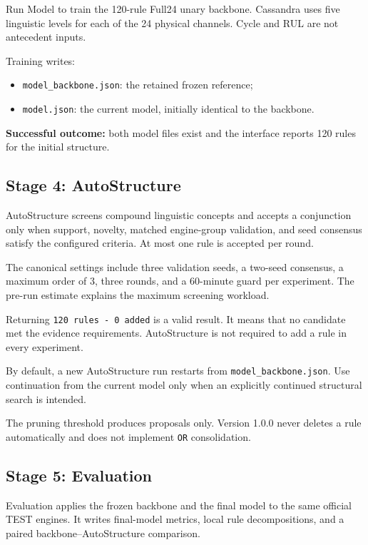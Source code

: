 \documentclass[11pt,a4paper]{article}
\begin{document}
Run Model to train the 120-rule Full24 unary backbone. Cassandra uses five
linguistic levels for each of the 24 physical channels. Cycle and RUL are not
antecedent inputs.

Training writes:

\begin{itemize}
  \item \texttt{model\_backbone.json}: the retained frozen reference;
  \item \texttt{model.json}: the current model, initially identical to the backbone.
\end{itemize}

\textbf{Successful outcome:} both model files exist and the interface reports
120 rules for the initial structure.

\subsection{Stage 4: AutoStructure}

AutoStructure screens compound linguistic concepts and accepts a conjunction
only when support, novelty, matched engine-group validation, and seed consensus
satisfy the configured criteria. At most one rule is accepted per round.

The canonical settings include three validation seeds, a two-seed consensus,
a maximum order of 3, three rounds, and a 60-minute guard per experiment. The
pre-run estimate explains the maximum screening workload.

\begin{importantbox}
Returning \texttt{120 rules - 0 added} is a valid result. It means that no
candidate met the evidence requirements. AutoStructure is not required to add a
rule in every experiment.
\end{importantbox}

By default, a new AutoStructure run restarts from
\texttt{model\_backbone.json}. Use continuation from the current model only when
an explicitly continued structural search is intended.

The pruning threshold produces proposals only. Version 1.0.0 never deletes a
rule automatically and does not implement \texttt{OR} consolidation.

\subsection{Stage 5: Evaluation}

Evaluation applies the frozen backbone and the final model to the same official
TEST engines. It writes final-model metrics, local rule decompositions, and a
paired backbone--AutoStructure comparison.
\end{document}
